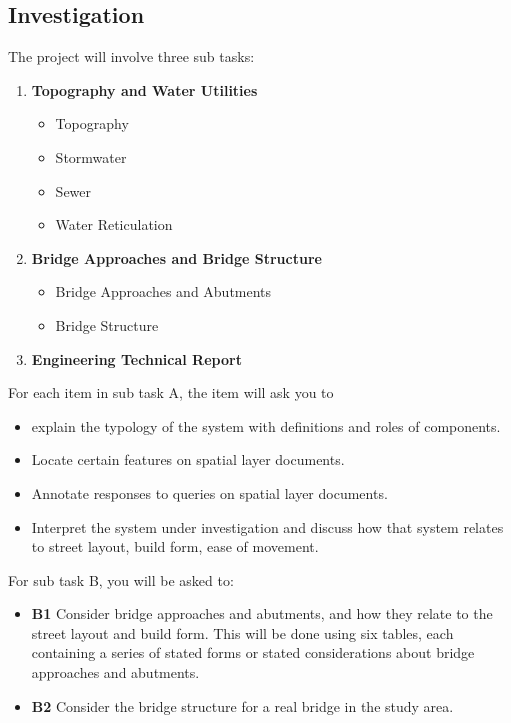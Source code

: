 \documentclass{report}
\begin{document}
	\subsection{Investigation}
	The project will involve three sub tasks:

	\begin{enumerate}
		\item \textbf{Topography and Water Utilities}
		\begin{itemize}
			\item Topography
			\item Stormwater
			\item Sewer
			\item Water Reticulation
		\end{itemize}
		\item \textbf{Bridge Approaches and Bridge Structure}
		\begin{itemize}
			\item Bridge Approaches and Abutments
			\item Bridge Structure
		\end{itemize}
		\item \textbf{Engineering Technical Report}
	\end{enumerate}

	For each item in sub task A, the item will ask you to 
	\begin{itemize}
		\item explain the typology of the system with definitions and roles of components. 
		\item Locate certain features on spatial layer documents.
		\item Annotate responses to queries on spatial layer documents.
		\item Interpret the system under investigation and discuss how that system relates to street layout, build form, ease of movement.
	\end{itemize}

	For sub task B, you will be asked to:
	\begin{itemize}
		\item \textbf{B1} Consider bridge approaches and abutments, and how they relate to the street layout and build form. This will be done using six tables, each containing a series of stated forms or stated considerations about bridge approaches and abutments.
		\item \textbf{B2} Consider the bridge structure for a real bridge in the study area. 
	\end{itemize}
\end{document}
